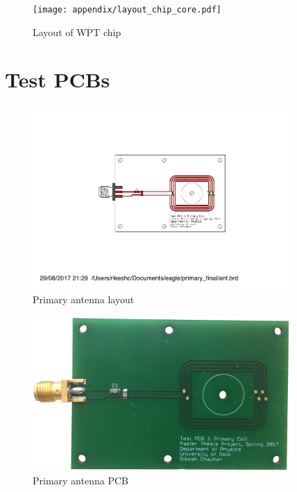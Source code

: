 \begin{appendices}
\begin{figure} [!htbp]	%
 	\centering
  	\texttt{[image: appendix/layout\_chip\_core.pdf]} 
 	\caption{Layout of WPT chip} 
	\label{fig:appen_layout_chip} 
\end{figure}

\chapter{Test PCBs}

\begin{figure} [!htbp]	%
 	\centering
  	\includegraphics[width=0.88\textwidth]{appendix/pcb_pri.pdf} 
 	\caption{Primary antenna layout} 
	\label{fig:appen_primary_layout} 
\end{figure}

\begin{figure} [!htbp]	%
 	\centering
  	\includegraphics[width=0.88\textwidth]{pcb/test_pri.png} 
 	\caption{Primary antenna PCB} 
	\label{fig:appen_primary_pcb} 
\end{figure}


\end{appendices}
